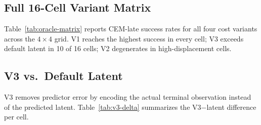 \subsection{Full 16-Cell Variant Matrix}

Table~\ref{tab:oracle-matrix} reports CEM-late success rates for all four
cost variants across the $4\times 4$ grid.  V1 reaches the highest success
in every cell; V3 exceeds default latent in 10 of 16 cells; V2 degenerates
in high-displacement cells.

\begin{table}[h]
\centering
\caption{CEM-late success rate (\%) by cost variant across the Track~A
$4\times 4$ grid.  Each cell evaluates 6--7 pairs $\times$ 20 CEM-late
actions.  Bold marks the highest rate per cell.}
\label{tab:oracle-matrix}
\end{table}

\subsection{V3 vs.\ Default Latent}
\label{app:v3_vs_latent}

V3 removes predictor error by encoding the actual terminal observation
instead of the predicted latent.  Table~\ref{tab:v3-delta} summarizes the
V3$-$latent difference per cell.

